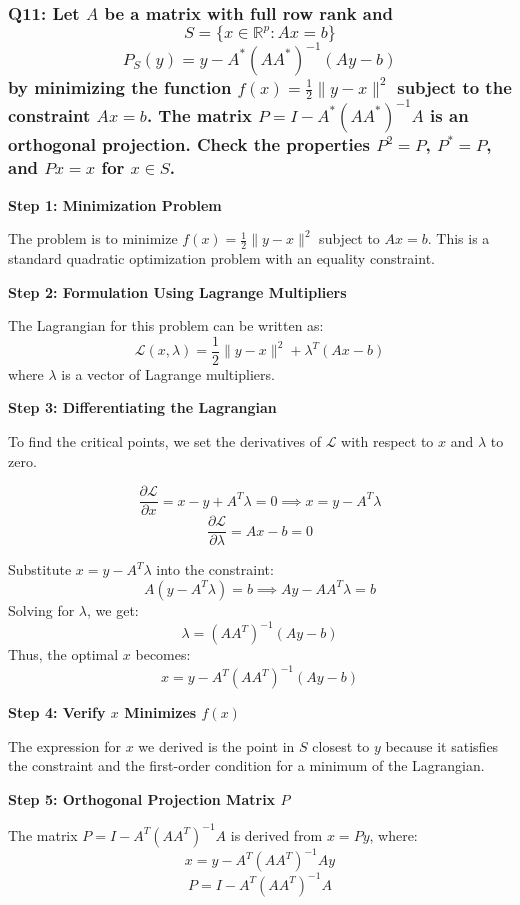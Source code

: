 \documentclass[8pt]{article}
\begin{document}
{\subsubsection*{Q11: Let \(A\) be a matrix with full row rank and
\[ S = \{x \in \mathbb{R}^p : Ax = b\} \]
\[ P_S(y) = y - A^* (AA^*)^{-1} (Ay - b) \]
by minimizing the function \(f(x) = \frac{1}{2} \|y - x\|^2\) subject to the constraint \(Ax = b\). The matrix \(P = I - A^* (AA^*)^{-1} A\) is an orthogonal projection. Check the properties \(P^2 = P\), \(P^* = P\), and \(Px = x\) for \(x \in S\).}

\textbf{Step 1: Minimization Problem}

The problem is to minimize \(f(x) = \frac{1}{2} \|y - x\|^2\) subject to \(Ax = b\). This is a standard quadratic optimization problem with an equality constraint.

\textbf{Step 2: Formulation Using Lagrange Multipliers}

The Lagrangian for this problem can be written as:
\[
\mathcal{L}(x, \lambda) = \frac{1}{2} \|y - x\|^2 + \lambda^T (Ax - b)
\]
where \(\lambda\) is a vector of Lagrange multipliers. 

\textbf{Step 3: Differentiating the Lagrangian}

To find the critical points, we set the derivatives of \(\mathcal{L}\) with respect to \(x\) and \(\lambda\) to zero.

\[
\frac{\partial \mathcal{L}}{\partial x} = x - y + A^T \lambda = 0 \implies x = y - A^T \lambda
\]
\[
\frac{\partial \mathcal{L}}{\partial \lambda} = Ax - b = 0
\]

Substitute \(x = y - A^T \lambda\) into the constraint:
\[
A(y - A^T \lambda) = b \implies Ay - AA^T \lambda = b
\]
Solving for \(\lambda\), we get:
\[
\lambda = (AA^T)^{-1}(Ay - b)
\]
Thus, the optimal \(x\) becomes:
\[
x = y - A^T (AA^T)^{-1} (Ay - b)
\]

\textbf{Step 4: Verify \(x\) Minimizes \(f(x)\)}

The expression for \(x\) we derived is the point in \(S\) closest to \(y\) because it satisfies the constraint and the first-order condition for a minimum of the Lagrangian.

\textbf{Step 5: Orthogonal Projection Matrix \(P\)}

The matrix \(P = I - A^T (AA^T)^{-1} A\) is derived from \(x = Py\), where:
\[
x = y - A^T (AA^T)^{-1} A y
\]
\[
P = I - A^T (AA^T)^{-1} A
\]

}
\end{document}
